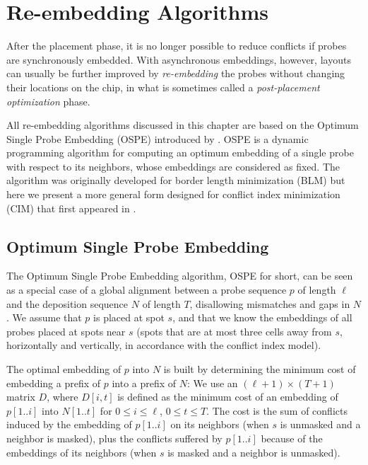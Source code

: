 \chapter{Re-embedding Algorithms}
\label{ch:reembed}

After the placement phase, it is no longer possible to reduce conflicts if
probes are synchronously embedded. With asynchronous embeddings, however,
layouts can usually be further improved by \emph{re-embedding} the probes
without changing their locations on the chip, in what is sometimes called a
\emph{post-placement optimization} phase.

All re-embedding algorithms discussed in this chapter are based on the Optimum
Single Probe Embedding (OSPE) introduced by \citet{Kahng2002}. OSPE is a dynamic
programming algorithm for computing an optimum embedding of a single probe with
respect to its neighbors, whose embeddings are considered as fixed. The
algorithm was originally developed for border length minimization (BLM) but here
we present a more general form designed for conflict index minimization (CIM)
that first appeared in \citep{Carvalho2006}.

\section{Optimum Single Probe Embedding}
\label{sec:reembed_ospe}

The Optimum Single Probe Embedding algorithm, OSPE for short, can be seen as a
special case of a global alignment between a probe sequence $p$ of length $\ell$
and the deposition sequence $N$ of length $T$, disallowing mismatches and gaps
in $N$. We assume that $p$ is placed at spot $s$, and that we know the
embeddings of all probes placed at spots near $s$ (spots that are at most three
cells away from $s$, horizontally and vertically, in accordance with the
conflict index model).

The optimal embedding of $p$ into $N$ is built by determining the minimum cost
of embedding a prefix of $p$ into a prefix of $N$: We use an
$(\ell + 1) \times (T + 1)$ matrix $D$, where $D[i,t]$ is defined as the minimum
cost of an embedding of $p[1..i]$ into $N[1..t]$ for $0 \leq i \leq \ell$,
$0 \leq t \leq T$. The cost is the sum of conflicts induced by the embedding of
$p[1..i]$ on its neighbors (when $s$ is unmasked and a neighbor is masked), plus
the conflicts suffered by $p[1..i]$ because of the embeddings of its neighbors
(when $s$ is masked and a neighbor is unmasked).


